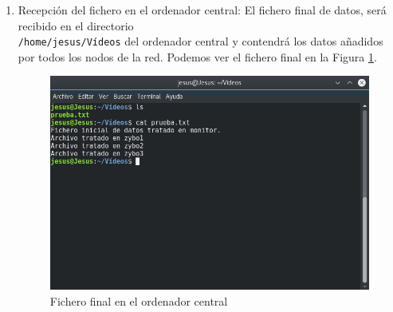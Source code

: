 \begin{enumerate}
	\item Recepción del fichero en el ordenador central: El fichero final de datos, será recibido en el directorio\\ \texttt{/home/jesus/Vídeos} del ordenador central y contendrá los datos añadidos por todos los nodos de la red. Podemos ver el fichero final en la Figura \ref{Fichero final en el ordenador central}.
	\newpage
	\begin{figure}[h]
		\centering
		\includegraphics[scale=0.5]{Metodologia/Pruebas/Fichero_final_en_PC.png}
		\caption{Fichero final en el ordenador central}
		\label{Fichero final en el ordenador central}
	\end{figure}
\end{enumerate}
